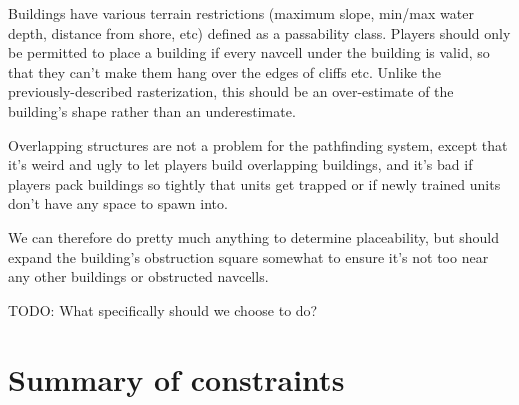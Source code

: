 \documentclass[a4paper,10pt]{article}
\begin{document}
Buildings have various terrain restrictions (maximum slope,
min/max water depth, distance from shore, etc)
defined as a passability class.
Players should only be permitted to place a building if every navcell
under the building is valid,
so that they can't make them hang over the edges of cliffs etc.
Unlike the previously-described rasterization,
this should be an over-estimate of the building's shape
rather than an underestimate.

Overlapping structures are not a problem for the pathfinding system,
except that it's weird and ugly to let players build overlapping buildings,
and it's bad if players pack buildings so tightly that units get trapped
or if newly trained units don't have any space to spawn into.

We can therefore do pretty much anything to determine placeability,
but should expand the building's obstruction square somewhat to ensure
it's not too near any other buildings or obstructed navcells.

TODO: What specifically should we choose to do?

\section{Summary of constraints}
\end{document}
